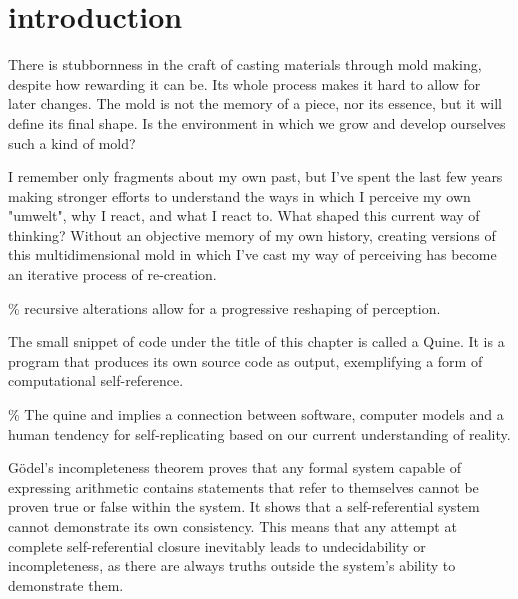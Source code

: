 \chapter*{introduction}
\begin{center}
\vspace{2cm}
\begin{flushright}
\footnotesize 

\end{flushright}
\vspace{2cm}
\end{center}
\normalsize

\newpage  %
There is stubbornness in the craft of casting materials through mold making, despite how rewarding it can be. Its whole process makes it hard to allow for later changes. The mold is not the memory of a piece, nor its essence, but it will define its final shape. Is the environment in which we grow and develop ourselves such a kind of mold? 

I remember only fragments about my own past, but I've spent the last few years making stronger efforts to understand the ways in which I perceive my own "umwelt", why I react, and what I react to.  What shaped this current way of thinking? Without an objective memory of my own history, creating versions of this multidimensional mold in which I've cast my way of perceiving has become an iterative process of re-creation.

{\scriptsize \textcolor{comment}{\% recursive alterations allow for a progressive reshaping of perception. }}

The small snippet of code under the title of this chapter is called a Quine. It is a program that produces its own source code as output, exemplifying a form of computational self-reference. 

{\scriptsize \textcolor{comment}{\% The quine and implies a connection between software, computer models and a human tendency for self-replicating based on our current understanding of reality.}}

Gödel's incompleteness theorem proves that any formal system capable of expressing arithmetic contains statements that refer to themselves cannot be proven true or false within the system. It shows that a self-referential system cannot demonstrate its own consistency. This means that any attempt at complete self-referential closure inevitably leads to undecidability or incompleteness, as there are always truths outside the system's ability to demonstrate them. 

